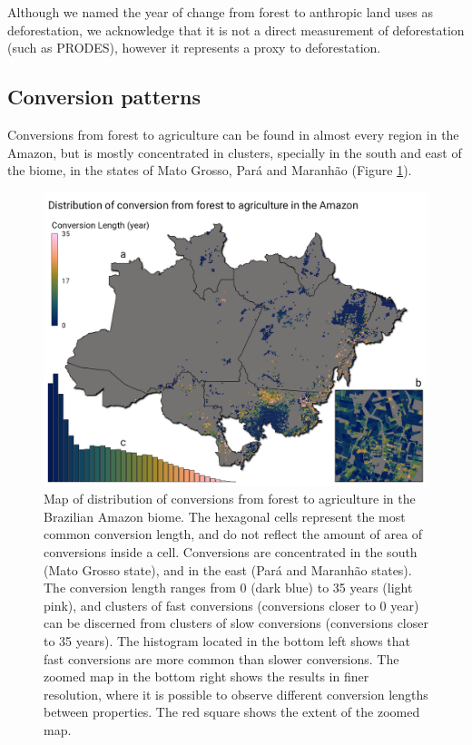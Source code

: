 \documentclass[essd, manuscript]{copernicus}
\begin{document}
Although we named the year of change from forest to anthropic land uses as deforestation, we acknowledge that it is not a direct measurement of deforestation (such as PRODES), however it represents a proxy to deforestation.

\subsection{Conversion patterns}

Conversions from forest to agriculture can be found in almost every region in the Amazon, but is mostly concentrated in clusters, specially in the south and east of the biome, in the states of Mato Grosso, Pará and Maranhão (Figure \ref{fig:map-plot}).

\begin{figure}[h]
\includegraphics[width=17cm]{figs/map} \caption{Map of distribution of conversions from forest to agriculture in the Brazilian Amazon biome. The hexagonal cells represent the most common conversion length, and do not reflect the amount of area of conversions inside a cell. Conversions are concentrated in the south (Mato Grosso state), and in the east (Pará and Maranhão states). The conversion length ranges from 0 (dark blue) to 35 years (light pink), and clusters of fast conversions (conversions closer to 0 year) can be discerned from clusters of slow conversions (conversions closer to 35 years). The histogram located in the bottom left shows that fast conversions are more common than slower conversions. The zoomed map in the bottom right shows the results in finer resolution, where it is possible to observe different conversion lengths between properties. The red square shows the extent of the zoomed map.}\label{fig:map-plot}
\end{figure}
\end{document}
